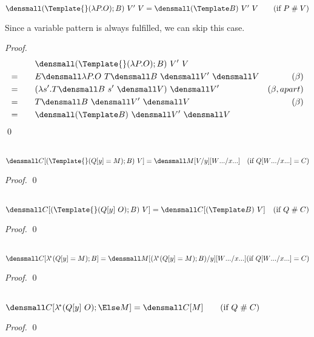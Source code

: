 \begin{lemma}
  \label{thm:template-do-apart}
  \\
  $\den{(\Template{} (\lambda P. O); B) ~ V' ~ V} = \den{(\Template B) ~ V' ~ V}
  \qquad (\text{if } P \apart V)$
\end{lemma}
Since a variable pattern is always fulfilled, we can skip this case.
\begin{proof}
  \begin{align*}
    & \qquad \den{(\Template{} (\lambda P. O); B) ~ V' ~ V} \\
    =& \qquad E\den{\lambda P. O} ~T\den{B} ~\den{V'} ~\den{V} & (\beta)\\
    =& \qquad (\lambda s'. T\den{B} ~s' ~\den{V}) ~\den{V'} & (\beta, apart)\\
    =& \qquad T\den{B} ~ \den{V'} ~ \den{V} & (\beta) \\
    =& \qquad \den{(\Template B)} ~ \den{V'} ~ \den{V}
  \end{align*}
  \qed
\end{proof}

\begin{lemma}
  \label{thm:context-match}
  \\
  $\den{C[(\Template{} (Q[y] = M); B) ~ V]} = \den{M\subst{y}{V}\subst{\many{x}}{\many{W}}}
  \quad (\text{if } Q\subst{\many{x}}{\many{W}} = C)$
\end{lemma}
\begin{proof}
  \qed
\end{proof}

\begin{lemma}
  \label{thm:context-apart}
  \\
  $\den{C[(\Template{} (Q[y] ~ O); B) ~ V]} = \den{  C[(\Template B) ~ V]}
  \quad (\text{if } Q \apart C)$
\end{lemma}
\begin{proof}
  \qed
\end{proof}

\begin{lemma}
  \label{thm:context-lamstar-match}
  \\
  $\den{C[\lamstar (Q[y] = M); B]} = \den{M\subst{y}{(\lamstar (Q[y] = M); B)}\subst{\many{x}}{\many{W}}}
  \\
  (\text{if } Q\subst{\many{x}}{\many{W}} = C)$
\end{lemma}
\begin{proof}
  \qed
\end{proof}

\begin{lemma}
  \label{thm:context-lamstar-apart}
  \\
  $\den{C[\lamstar (Q[y] ~ O); \Else M]} = \den{C[M]}
  \qquad (\text{if } Q \apart C)$
\end{lemma}
\begin{proof}
  \qed
\end{proof}


